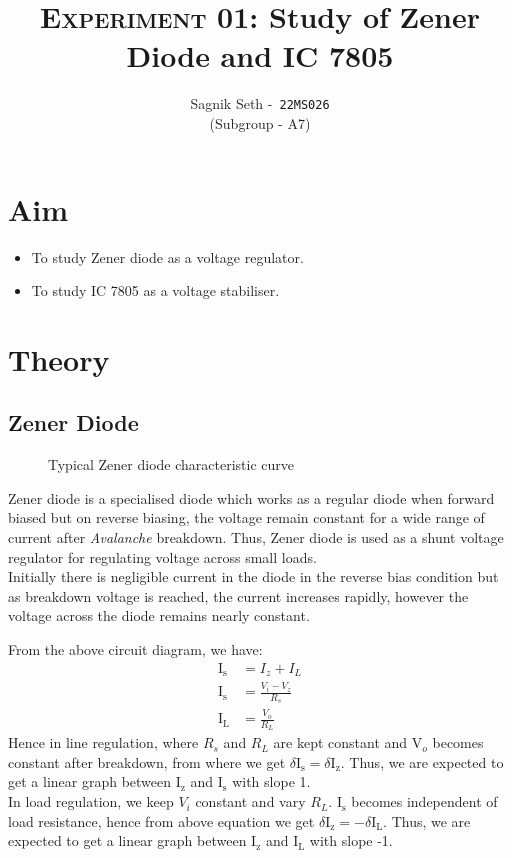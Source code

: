 \documentclass{scrartcl}
\title{
        \Large\textsc{Experiment 01: }
        \huge\textbf{Study of Zener Diode and IC 7805} \\
}
\author{{\Large Sagnik Seth} -\   \texttt{22MS026}\\ ({\small Subgroup - A7}) }
\date{}
\begin{document}
\maketitle
\section{Aim}
\begin{itemize}
        \item To study Zener diode as a voltage regulator.
        \item To study IC 7805 as a voltage stabiliser.
\end{itemize}

\section{Theory}
\subsection{Zener Diode}
\begin{figure}[H]
        \centering
        
        \caption{Typical Zener diode characteristic curve}
\end{figure}
Zener diode is a specialised diode which works as a regular diode when forward biased but on reverse biasing, the voltage remain constant for a wide range of current after \textit{Avalanche} breakdown. Thus, Zener diode is used as a shunt voltage regulator for regulating voltage across small loads.\\[0.3cm]
Initially there is negligible current in the diode in the reverse bias condition but as breakdown voltage is reached, the current increases rapidly, however the voltage across the diode remains nearly constant.

\noindent
From the above circuit diagram, we have:
\begin{align}
        \mathrm{I_s} &= I_z+I_L\\
        \mathrm{I_s} &= \frac{V_i - V_z}{R_s}\\
        \mathrm{I_L} &= \frac{V_o}{R_L}
\end{align}
Hence in line regulation, where $R_s$ and $R_L$ are kept constant and $\mathrm{V}_o$ becomes constant after breakdown, from where we get $\delta \mathrm{I_s} = \delta \mathrm{I_z}$. Thus, we are expected to get a linear graph between $\mathrm{I_z}$ and $\mathrm{I_s}$ with slope 1.\\[0.3cm]
In load regulation, we keep $V_i$ constant and vary $R_L$. $\mathrm{I_s}$ becomes independent of load resistance, hence from above equation we get $\delta \mathrm{I_z} = -\delta \mathrm{I_L}$. Thus, we are expected to get a linear graph between $\mathrm{I_z}$ and $\mathrm{I_L}$ with slope -1.
\noindent
\end{document}
